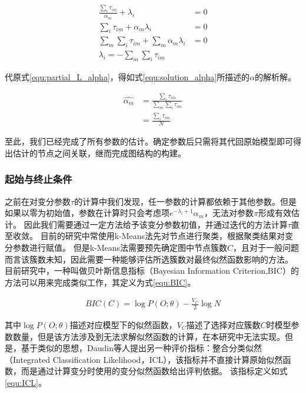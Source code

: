 \begin{equation}\begin{aligned}
\frac{\sum_i\tau_{im}}{\alpha_m}+\lambda_i&=0\\
\sum_i\tau_{im}+\alpha_m\lambda_i&=0\\
\sum_m\sum_i\tau_{im}+\sum_m\alpha_m\lambda_i&=0\\
\lambda_i=-\sum_m\sum_i\tau_{im}
\end{aligned}\end{equation}

代原式\ref{equ:partial_L_alpha}，得如式\ref{equ:solution_alpha}所描述的$\alpha$的解析解。

\begin{equation}\label{equ:solution_alpha}
  \begin{aligned}
\hat{\alpha_m}&=\frac{\sum_i\tau_{im}}{\sum_m\sum_i\tau_{im}}\\
&=\frac{\sum_i\tau_{im}}{N}
\end{aligned}\end{equation}

至此，我们已经完成了所有参数的估计。确定参数后只需将其代回原始模型即可得出估计的节点之间关联，继而完成图结构的构建。

\subsubsection{起始与终止条件}

之前在对变分参数$\tau$的计算中我们发现，任一参数的计算都依赖于其他参数。但是如果以零为初始值，参数在计算时只会考虑项$e^{-\lambda_i+1}\alpha_m$，无法对参数$\pi$形成有效估计。
因此我们需要通过一定方法给予该变分参数初值，并通过迭代的方法计算$\tau$直至收敛。
目前的研究中常使用k-Means法\cite{haj_estimation_2020}先对节点进行聚类，根据聚类结果对变分参数进行赋值。
但是k-Means法需要预先确定图中节点簇数$C$，且对于一般问题而言该簇数未知，因此需要一种能够评估所选簇数对最终似然函数影响的方法。
目前研究中，一种叫做贝叶斯信息指标（Bayesian Information Criterion,BIC）\cite{schwarz_estimating_1978}的方法可以用来完成类似工作，其定义为式\ref{equ:BIC}。

\begin{equation}\label{equ:BIC}
  \begin{aligned}
    BIC(C)=\log P(O;\theta)-\frac{V_C}{2}\log N
\end{aligned}\end{equation}

其中$\log P(O;\theta)$描述对应模型下的似然函数，$V_C$描述了选择对应簇数$C$时模型参数数量，但是该方法涉及到无法求解似然函数的计算，在本研究中无法实现。但是，基于类似的思想，Daudin等人提出另一种评价指标：整合分类似然（Integrated Classification Likelihood，ICL）\cite{daudin_mixture_2008}，该指标并不直接计算原始似然函数，而是通过计算变分时使用的变分似然函数给出评判依据。
该指标定义如式\ref{equ:ICL}。

